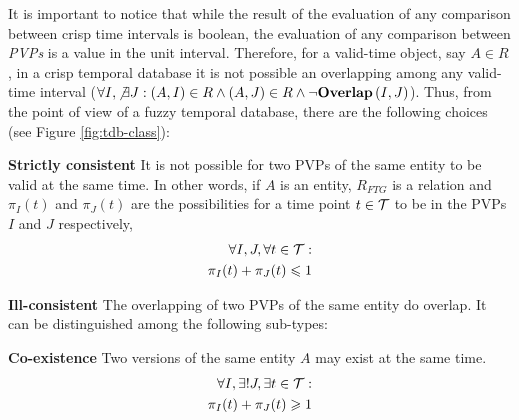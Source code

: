 It is important to notice that while the result of the evaluation of any comparison between crisp time intervals is boolean, the evaluation of any comparison between \emph{PVPs} is a value in the unit interval.  Therefore, for a valid-time object, say $A \in R$, in a crisp temporal database it is not possible an overlapping among any valid-time interval ($\forall I, \not \exists J: \left(A, I \right) \in R \wedge \left(A, J \right) \in R \wedge \lnot \mbox{\textbf{Overlap}}\left(I, J \right)$). Thus, from the point of view of a fuzzy temporal database, there are the following choices (see Figure \ref{fig:tdb-class}):

\begin{definition}
\textbf{Strictly consistent} It is not possible for two PVPs of the same entity to be valid at the same time. In other words, if $A$ is an entity, $R_{FTG}$ is a relation and $\pi_{I}\left(t \right)$ and $\pi_{J}\left(t \right)$ are the possibilities for a time point $t \in \mathcal{T}$ to be in the PVPs $I$ and $J$ respectively,
\begin{align}
\label{eq:stricly-consistent}
\forall I,J, \forall t \in \mathcal{T} :\\
\nonumber
\pi_{I}(t) + \pi_{J}(t) \leqslant 1
\end{align}
\end{definition}




\begin{definition}
 \textbf{Ill-consistent} The overlapping of two PVPs of the same entity do overlap. It can be distinguished among the following sub-types:
\end{definition}
	      \begin{definition}
	      \textbf{Co-existence} Two versions of the same entity $A$ may exist at the same time.
		      \begin{align}
		      \label{eq:co-existence}
		      \forall I, \exists ! J, \exists t \in \mathcal{T} : \\
		      \nonumber
		      \pi_{I}(t) + \pi_{J}(t) \geqslant 1
		      \end{align}
	      \end{definition}


